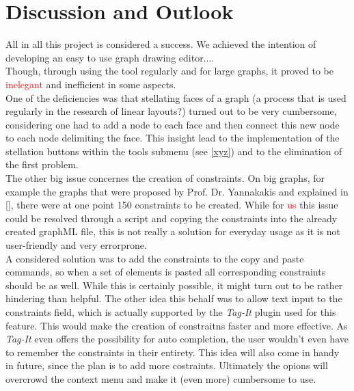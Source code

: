 
\chapter{Discussion and Outlook}
  \label{Discussion}

All in all this project is considered a success. We achieved the intention of developing an easy to use graph drawing editor....\\
Though, through using the tool regularly and for large graphs, it proved to be \textcolor{red}{inelegant} and inefficient in some aspects.\\
One of the deficiencies was that stellating faces of a graph (a process that is used regularly in the research of linear layouts?) turned out to be very cumbersome, considering one had to add a node to each face and then connect this new node to each node delimiting the face. This insight lead to the implementation of the stellation buttons within the tools submenu (see \autoref{xyz}) and to the elimination of the first problem.\\
The other big issue concernes the creation of constraints. On big graphs, for example the graphs that were proposed by Prof. Dr. Yannakakis \cite{yannakakis1986four} and explained in \autoref{}, there were at one point 150 constraints to be created. While for \textcolor{red}{us} this issue could be resolved through a script and copying the constraints into the already created graphML file, this is not really a solution for everyday usage as it is not user-friendly and very errorprone.\\
A considered solution was to add the constraints to the copy and paste commands, so when a set of elements is pasted all corresponding constraints should be as well. While this is certainly possible, it might turn out to be rather hindering than helpful. The other idea this behalf was to allow text input to the constraints field, which is actually supported by the \textit{Tag-It} plugin used for this feature. This would make the creation of constraitns faster and more effective. As \textit{Tag-It} even offers the possibility for auto completion, the user wouldn't even have to remember the constraints in their entirety. This idea will also come in handy in future, since the plan is to add more costraints. Ultimately the opions will overcrowd the context menu and make it (even more) cumbersome to use.\\



